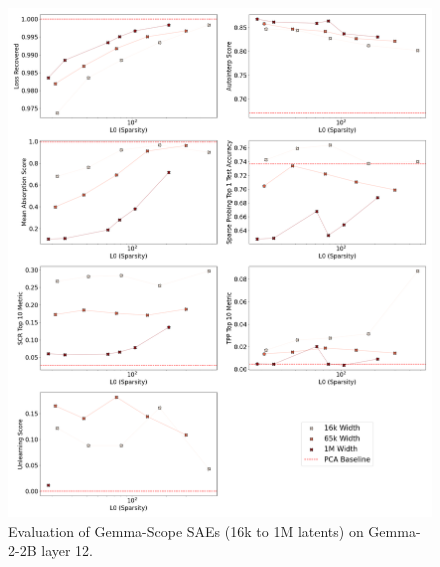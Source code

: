 \documentclass{article}
\theoremstyle{plain}
\theoremstyle{definition}
\theoremstyle{remark}
\begin{document}
\begin{figure}[h!]
    \centering
    \includegraphics[width=\columnwidth]{images/gemma-scope/plot_2x4_gemma-scope_gemma-2-2b_width_series_layer_12.png}
    \caption{Evaluation of Gemma-Scope SAEs (16k to 1M latents) on Gemma-2-2B layer 12.}
\end{figure}
\end{document}
